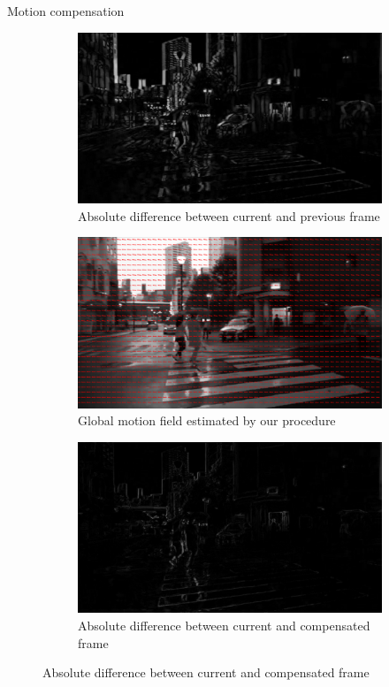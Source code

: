 \documentclass[aspectratio=1610,xcolor=dvipsnames]{beamer}
\begin{document}
\begin{frame}{Motion compensation}
\begin{figure}[htbp]
        \begin{subfigure}[b]{0.3\textwidth}
            \centering
            \includegraphics[width=\textwidth]{images/tokyo-curr_prev_diff.png}
            \caption{Absolute difference between current and previous frame}
            \label{fig:tokyo-diff-curr-prev}
        \end{subfigure}
        \hfill
        \begin{subfigure}[b]{0.3\textwidth}
            \includegraphics[width=\textwidth]{images/tokyo-model_motion_field.png}
            \caption{Global motion field estimated by our procedure}
            \label{fig:tokyo-est-mf}
        \end{subfigure}
        \hfill
        \begin{subfigure}[b]{0.3\textwidth}
            \includegraphics[width=\textwidth]{images/tokyo-curr_comp_diff.png}
            \caption{Absolute difference between current and compensated frame}
            \label{fig:tokyo-diff-curr-comp}
        \end{subfigure}
    

\end{figure}
\end{frame}
\end{document}
